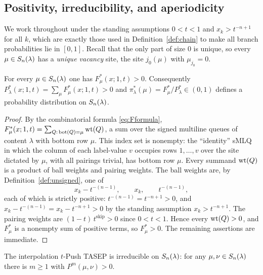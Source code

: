 \subsection*{Positivity, irreducibility, and aperiodicity}

We work throughout under the standing assumptions $0<t<1$ and $x_k>t^{-n+1}$ for
all $k$, which are exactly those used in Definition~\ref{def:chain} to make all
branch probabilities lie in $[0,1]$. Recall that the only part of size $0$ is
unique, so every $\mu\in S_n(\lambda)$ has a \emph{unique vacancy} site, the site
$j_0(\mu)$ with $\mu_{j_0}=0$.

\begin{qthreelemma}\label{lem:positivity}
For every $\mu\in S_n(\lambda)$ one has $F^*_\mu(x;1,t)>0$. Consequently
$P^*_\lambda(x;1,t)=\sum_{\mu}F^*_\mu(x;1,t)>0$ and
$\pi^*_\lambda(\mu)=F^*_\mu/P^*_\lambda\in(0,1)$ defines a probability
distribution on $S_n(\lambda)$.
\end{qthreelemma}

\begin{proof}
By the combinatorial formula \eqref{eq:Fformula},
$F^*_\mu(x;1,t)=\sum_{Q:\,\mathrm{bot}(Q)=\mu}\operatorname{wt}(Q)$, a sum over the signed
multiline queues of content $\lambda$ with bottom row $\mu$. This index set is
nonempty: the ``identity'' sMLQ in which the column of each label-value $v$
occupies rows $1,\dots,v$ over the site dictated by $\mu$, with all pairings
trivial, has bottom row $\mu$. Every summand $\operatorname{wt}(Q)$ is a product of ball
weights and pairing weights. The ball weights are, by
Definition~\ref{def:unsigned}, one of
\[
x_k-t^{-(n-1)},\qquad x_k,\qquad t^{-(n-1)} ,
\]
each of which is strictly positive: $t^{-(n-1)}=t^{-n+1}>0$, and
$x_k-t^{-(n-1)}=x_k-t^{-n+1}>0$ by the standing assumption $x_k>t^{-n+1}$. The
pairing weights are $(1-t)\,t^{\mathrm{skip}}>0$ since $0<t<1$. Hence every
$\operatorname{wt}(Q)>0$, and $F^*_\mu$ is a nonempty sum of positive terms, so
$F^*_\mu>0$. The remaining assertions are immediate.
\end{proof}

\begin{qthreelemma}[irreducibility]\label{lem:irreducible}
The interpolation $t$-Push TASEP is irreducible on $S_n(\lambda)$: for any
$\mu,\nu\in S_n(\lambda)$ there is $m\ge1$ with $P^m(\mu,\nu)>0$.
\end{qthreelemma}

